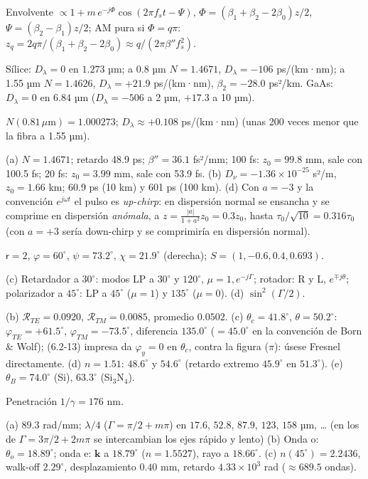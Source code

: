 \documentclass[10pt]{article}
\newcommand{\kv}{\mathbf k}
\begin{document}
{\begin{description}[leftmargin=1.2em,itemsep=2pt]
\item[14.] Envolvente $\propto1+m\,e^{-j\Phi}\cos(2\pi f_st-\Psi)$, $\Phi=(\beta_1+\beta_2-2\beta_0)z/2$, $\Psi=(\beta_2-\beta_1)z/2$; AM pura si $\Phi=q\pi$: $z_q=2q\pi/(\beta_1+\beta_2-2\beta_0)\approx q/(2\pi\beta''f_s^2)$.
\item[15.] Sílice: $D_\lambda=0$ en $1.273$ µm; a 0.8 µm $N=1.4671$, $D_\lambda=-106$ ps/(km·nm); a 1.55 µm $N=1.4626$, $D_\lambda=+21.9$ ps/(km·nm), $\beta_2=-28.0$ ps²/km. GaAs: $D_\lambda=0$ en $6.84$ µm ($D_\lambda=-506$ a 2 µm, $+17.3$ a 10 µm).
\item[16.] $N(0.81\,\mu\mathrm m)=1.000273$; $D_\lambda\approx+0.108$ ps/(km·nm) (unas 200 veces menor que la fibra a 1.55 µm).
\item[17.] (a) $N=1.4671$; retardo 48.9 ps; $\beta''=36.1$ fs²/mm; 100 fs: $z_0=99.8$ mm, sale con 100.5 fs; 20 fs: $z_0=3.99$ mm, sale con 53.9 fs. (b) $D_\nu=-1.36\times10^{-25}$ s²/m, $z_0=1.66$ km; 60.9 ps (10 km) y 601 ps (100 km). (d) Con $a=-3$ y la convención $e^{j\omega t}$ el pulso es \emph{up-chirp}: en dispersión normal se ensancha y se comprime en dispersión \emph{anómala}, a $z=\frac{|a|}{1+a^2}z_0=0.3z_0$, hasta $\tau_0/\sqrt{10}=0.316\tau_0$ (con $a=+3$ sería down-chirp y se comprimiría en dispersión normal).
\item[18.] $\mathsf r=2$, $\varphi=60^\circ$, $\psi=73.2^\circ$, $\chi=21.9^\circ$ (derecha); $S=(1,-0.6,0.4,0.693)$.
\item[19.] (c) Retardador a $30^\circ$: modos LP a $30^\circ$ y $120^\circ$, $\mu=1,e^{-j\Gamma}$; rotador: R y L, $e^{\mp j\theta}$; polarizador a $45^\circ$: LP a $45^\circ$ ($\mu=1$) y $135^\circ$ ($\mu=0$). (d) $\sin^2(\Gamma/2)$.
\item[21.] (b) $\mathcal R_{TE}=0.0920$, $\mathcal R_{TM}=0.0085$, promedio $0.0502$. (c) $\theta_c=41.8^\circ$, $\theta=50.2^\circ$: $\varphi_{TE}=+61.5^\circ$, $\varphi_{TM}=-73.5^\circ$, diferencia $135.0^\circ$ ($=45.0^\circ$ en la convención de Born \& Wolf); (6.2-13) impresa da $\varphi_y=0$ en $\theta_c$, contra la figura ($\pi$): úsese Fresnel directamente. (d) $n=1.51$: $48.6^\circ$ y $54.6^\circ$ (retardo extremo $45.9^\circ$ en $51.3^\circ$). (e) $\theta_B=74.0^\circ$ (Si), $63.3^\circ$ (Si$_3$N$_4$).
\item[22.] Penetración $1/\gamma=176$ nm.
\item[23.] (a) $89.3$ rad/mm; $\lambda/4$ ($\Gamma=\pi/2+m\pi$) en $17.6$, $52.8$, $87.9$, $123$, $158$ µm, … (en los de $\Gamma=3\pi/2+2m\pi$ se intercambian los ejes rápido y lento) (b) Onda o: $\theta_o=18.89^\circ$; onda e: $\kv$ a $18.79^\circ$ ($n=1.5527$), rayo a $18.66^\circ$. (c) $n(45^\circ)=2.2436$, walk-off $2.29^\circ$, desplazamiento $0.40$ mm, retardo $4.33\times10^3$ rad ($\approx689.5$ ondas).

\end{description}}
\end{document}
